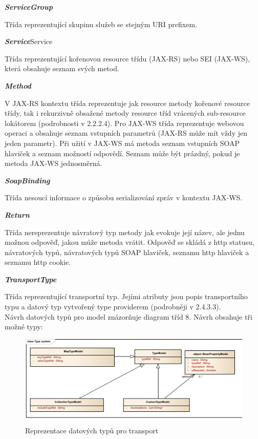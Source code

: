 \documentclass[11pt,twoside,a4paper]{book}
\begin{document}
\textbf{\textit{ServiceGroup}}

Třída reprezentující skupinu služeb se stejným URI prefixem.

\textbf{\textit{Service}}Service

Třída reprezentující kořenovou resource třídu (JAX-RS) nebo SEI (JAX-WS), která obsahuje
seznam svých metod.

\textbf{\textit{Method}}

V JAX-RS kontextu třída reprezentuje jak resource metody kořenové resource třídy, tak i
rekurzivně obsažené metody resource tříd vrácených sub-resource lokátorem (podrobnosti v
2.2.2.4). Pro JAX-WS třída reprezentuje webovou operaci a obsahuje seznam vstupních
parametrů (JAX-RS může mít vždy jen jeden parametr). Při užití v JAX-WS má metoda
seznam vstupních SOAP hlaviček a seznam možností odpovědí. Seznam může být prázdný,
pokud je metoda JAX-WS jednosměrná.

\textbf{\textit{SoapBinding}}

Třída nesoucí informace o způsobu serializování zpráv v kontextu JAX-WS.

\textbf{\textit{Return}}

Třída nereprezentuje návratový typ metody jak evokuje její název, ale jednu možnou
odpověď, jakou může metoda vrátit. Odpověď se skládá z http statusu, návratových typů,
návratových typů SOAP hlaviček, seznamu http hlaviček a seznamu http cookie.

\textbf{\textit{TransportType}}

Třída reprezentující transportní typ. Jejími atributy jsou popis transportního typu a datový typ
vytvořený type providerem (podrobněji v 2.4.3.3).
\mbox{}\\
Návrh datových typů pro model znázorňuje diagram tříd 8. Návrh obsahuje tři možné typy:

\begin{figure}[h]
\begin{center}
\includegraphics[width=13cm]{images-pdf/Type-System.pdf}
\caption{Reprezentace datových typů pro transport}
\label{fig:logo}
\end{center}
\end{figure}
\end{document}
